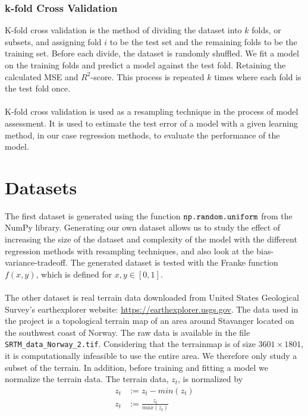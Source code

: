 \documentclass[a4paper,twocolumn]{article}
\begin{document}
\subsubsection{k-fold Cross Validation}
K-fold cross validation is the method of dividing the dataset into $k$ folds, or subsets, and assigning fold $i$ to be the test set and the remaining folds to be the training set. Before each divide, the dataset is randomly shuffled. We fit a model on the training folds and predict a model against the test fold. Retaining the calculated MSE and $R^{2}$-score. This process is repeated $k$ times where each fold is the test fold once.\\
\\
K-fold cross validation is used as a resampling technique in the process of model assessment. It is used to estimate the test error of a model with a given learning method, in our case regression methods, to evaluate the performance of the model.
\section{Datasets}
The first dataset is generated using the function $\verb"np.random.uniform"$ from the NumPy library. Generating our own dataset allows us to study the effect of increasing the size of the dataset and complexity of the model with the different regression methods with resampling techniques, and also look at the bias-variance-tradeoff. The generated dataset is tested with the Franke function $f(x,y)$, which is defined for $x,y \in [0,1]$.\\
\\
The other dataset is real terrain data downloaded from United States Geological Survey's earthexplorer website: \href{https://earthexplorer.usgs.gov}{\color{blue}https://earthexplorer.usgs.gov}. The data used in the project is a topological terrain map of an area around Stavanger located on the southwest coast of Norway. The raw data is available in the file \verb"SRTM_data_Norway_2.tif". Considering that the terrainmap is of size $3601\times 1801$, it is computationally infeasible to use the entire area. We therefore only study a subset of the terrain. In addition, before training and fitting a model we normalize the terrain data. The terrain data, $z_{t}$, is normalized by
\begin{align*}
    z_{t} &:= z_{t} - min(z_{t})\\
    z_{t} &:= \frac{z_{t}}{max(z_{t})}
\end{align*}
\end{document}
